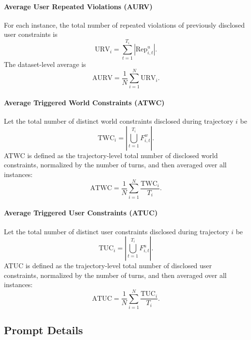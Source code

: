 \paragraph{Average User Repeated Violations (AURV)}
For each instance, the total number of repeated violations of previously disclosed user constraints is
\begin{equation}
\mathrm{URV}_i
=
\sum_{t=1}^{T_i} \left| \mathrm{Rep}_{i,t}^u \right|.
\end{equation}
The dataset-level average is
\begin{equation}
\mathrm{AURV}
=
\frac{1}{N}\sum_{i=1}^{N} \mathrm{URV}_i.
\end{equation}

\paragraph{Average Triggered World Constraints (ATWC)}
Let the total number of distinct world constraints disclosed during trajectory $i$ be
\begin{equation}
\mathrm{TWC}_i
=
\left|
\bigcup_{t=1}^{T_i} F_{i,t}^w
\right|.
\end{equation}
ATWC is defined as the trajectory-level total number of disclosed world constraints,
normalized by the number of turns, and then averaged over all instances:
\begin{equation}
\mathrm{ATWC}
=
\frac{1}{N}\sum_{i=1}^{N}
\frac{\mathrm{TWC}_i}{T_i}.
\end{equation}

\paragraph{Average Triggered User Constraints (ATUC)}
Let the total number of distinct user constraints disclosed during trajectory $i$ be
\begin{equation}
\mathrm{TUC}_i
=
\left|
\bigcup_{t=1}^{T_i} F_{i,t}^u
\right|.
\end{equation}
ATUC is defined as the trajectory-level total number of disclosed user constraints,
normalized by the number of turns, and then averaged over all instances:
\begin{equation}
\mathrm{ATUC}
=
\frac{1}{N}\sum_{i=1}^{N}
\frac{\mathrm{TUC}_i}{T_i}.
\end{equation}


\subsection{Prompt Details}
\label{app:prompt-details}

